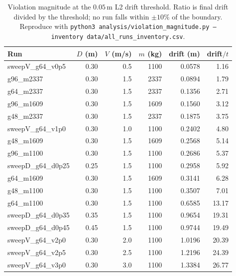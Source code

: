 \begin{table}[t]
\caption{Violation magnitude at the $0.05$\,m L2 drift threshold. Ratio is final drift divided by the threshold; no run falls within $\pm10\%$ of the boundary. Reproduce with \texttt{python3 analysis/violation\_magnitude.py --inventory data/all\_runs\_inventory.csv}.}
\label{tab:violation}
\centering
\begin{tabular}{lrrrrr}
\hline
Run & $D$ (m) & $V$ (m/s) & $m$ (kg) & drift (m) & drift$/t$ \\
\hline
sweepV\_g64\_v0p5 & 0.30 & 0.5 & 1100 & 0.0578 & 1.16 \\
g96\_m2337 & 0.30 & 1.5 & 2337 & 0.0894 & 1.79 \\
g64\_m2337 & 0.30 & 1.5 & 2337 & 0.1356 & 2.71 \\
g96\_m1609 & 0.30 & 1.5 & 1609 & 0.1560 & 3.12 \\
g48\_m2337 & 0.30 & 1.5 & 2337 & 0.1875 & 3.75 \\
sweepV\_g64\_v1p0 & 0.30 & 1.0 & 1100 & 0.2402 & 4.80 \\
g48\_m1609 & 0.30 & 1.5 & 1609 & 0.2568 & 5.14 \\
g96\_m1100 & 0.30 & 1.5 & 1100 & 0.2686 & 5.37 \\
sweepD\_g64\_d0p25 & 0.25 & 1.5 & 1100 & 0.2958 & 5.92 \\
g64\_m1609 & 0.30 & 1.5 & 1609 & 0.3141 & 6.28 \\
g48\_m1100 & 0.30 & 1.5 & 1100 & 0.3507 & 7.01 \\
g64\_m1100 & 0.30 & 1.5 & 1100 & 0.6585 & 13.17 \\
sweepD\_g64\_d0p35 & 0.35 & 1.5 & 1100 & 0.9654 & 19.31 \\
sweepD\_g64\_d0p45 & 0.45 & 1.5 & 1100 & 0.9744 & 19.49 \\
sweepV\_g64\_v2p0 & 0.30 & 2.0 & 1100 & 1.0196 & 20.39 \\
sweepV\_g64\_v2p5 & 0.30 & 2.5 & 1100 & 1.2196 & 24.39 \\
sweepV\_g64\_v3p0 & 0.30 & 3.0 & 1100 & 1.3384 & 26.77 \\
\hline
\end{tabular}
\end{table}
